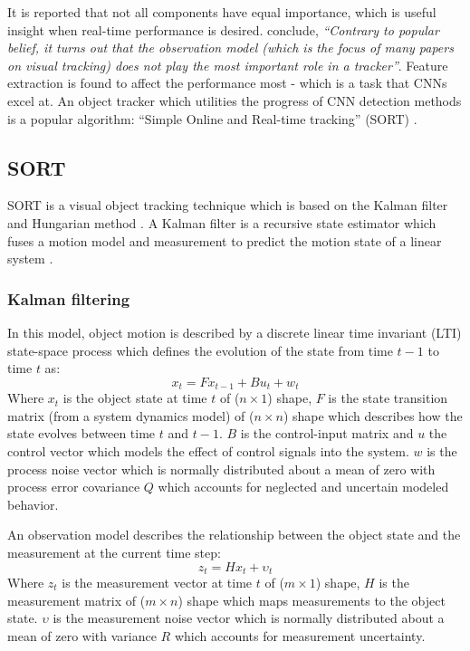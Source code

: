 \documentclass[a4paper,twoside,12pt]{report}
\begin{document}
It is reported that not all components have equal importance, which is useful insight when real-time performance is desired. \cite{diagnosingtrack} conclude, \textit{``Contrary to popular belief, it turns out that the observation model (which is the focus of many papers on visual tracking) does not play the most important role in a tracker''}. Feature extraction is found to affect the performance most - which is a task that CNNs excel at. An object tracker which utilities the progress of CNN detection methods is a popular algorithm: ``Simple Online and Real-time tracking'' (SORT) \citep{sort}.

\subsection{SORT}

SORT is a visual object tracking technique which is based on the Kalman filter \citep{kalman} and Hungarian method \citep{hungarian}. A Kalman filter is a recursive state estimator which fuses a motion model and measurement to predict the motion state of a linear system \citep{trackbook}. 

\subsubsection{Kalman filtering}

In this model, object motion is described by a discrete linear time invariant (LTI) state-space process which defines the evolution of the state from time $t-1$ to time $t$ as:
\begin{equation} 
x_t=Fx_{t-1}+Bu_{t}+w_{t}
\end{equation}
Where $x_{t}$ is the object state at time $t$ of ($n \times 1$) shape, $F$ is the state transition matrix (from a system dynamics model) of ($n \times n$) shape which describes how the state evolves between time $t$ and $t-1$. $B$ is the control-input matrix and $u$ the control vector which models the effect of control signals into the system. $w$ is the process noise vector which is normally distributed about a mean of zero with process error covariance $Q$ which accounts for neglected and uncertain modeled behavior.

An observation model describes the relationship between the object state and the measurement at the current time step:
\begin{equation} 
z_t=Hx_{t}+{\upsilon}_t
\end{equation}
Where $z_{t}$ is the measurement vector at time $t$ of ($m \times 1$) shape, $H$ is the measurement matrix of ($m \times n$) shape which maps measurements to the object state. $\upsilon$ is the measurement noise vector which is normally distributed about a mean of zero with variance $R$ which accounts for measurement uncertainty.
\end{document}

